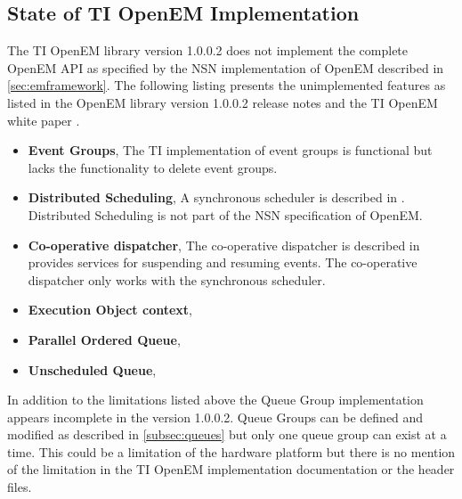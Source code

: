 \subsection{State of TI OpenEM Implementation}
\label{subsec:ti-implementation-state}
The TI OpenEM library version 1.0.0.2 does not implement the complete OpenEM API as specified by the NSN implementation of OpenEM described in \ref{sec:emframework}. The following listing presents the unimplemented features as listed in the OpenEM library version 1.0.0.2 release notes \cite{openemnotes} and the TI OpenEM white paper \cite{moerman2014open}.

\begin{itemize}
    \item \textbf{Event Groups},
        The TI implementation of event groups is functional but lacks the functionality to delete event groups.
    \item \textbf{Distributed Scheduling},
        A synchronous scheduler is described in \cite{moerman2014open}. Distributed Scheduling is not part of the NSN specification of OpenEM.
    \item \textbf{Co-operative dispatcher},
        The co-operative dispatcher is described in \cite{moerman2014open} provides services for suspending and resuming events. The co-operative dispatcher only works with the synchronous scheduler.
    \item \textbf{Execution Object context},
    \item \textbf{Parallel Ordered Queue},
    \item \textbf{Unscheduled Queue},
\end{itemize}

In addition to the limitations listed above the Queue Group implementation appears incomplete in the version 1.0.0.2. Queue Groups can be defined and modified as described in \ref{subsec:queues} but only one queue group can exist at a time. This could be a limitation of the hardware platform but there is no mention of the limitation in the TI OpenEM implementation documentation or the header files.

